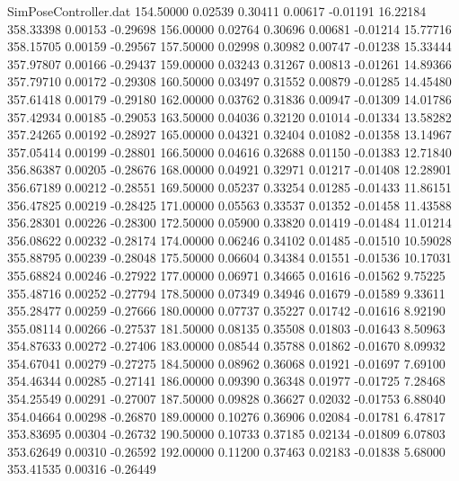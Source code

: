 \begin{filecontents}{SimPoseController.dat}
 154.50000    0.02539    0.30411     0.00617   -0.01191   16.22184  358.33398    0.00153   -0.29698
 156.00000    0.02764    0.30696     0.00681   -0.01214   15.77716  358.15705    0.00159   -0.29567
 157.50000    0.02998    0.30982     0.00747   -0.01238   15.33444  357.97807    0.00166   -0.29437
 159.00000    0.03243    0.31267     0.00813   -0.01261   14.89366  357.79710    0.00172   -0.29308
 160.50000    0.03497    0.31552     0.00879   -0.01285   14.45480  357.61418    0.00179   -0.29180
 162.00000    0.03762    0.31836     0.00947   -0.01309   14.01786  357.42934    0.00185   -0.29053
 163.50000    0.04036    0.32120     0.01014   -0.01334   13.58282  357.24265    0.00192   -0.28927
 165.00000    0.04321    0.32404     0.01082   -0.01358   13.14967  357.05414    0.00199   -0.28801
 166.50000    0.04616    0.32688     0.01150   -0.01383   12.71840  356.86387    0.00205   -0.28676
 168.00000    0.04921    0.32971     0.01217   -0.01408   12.28901  356.67189    0.00212   -0.28551
 169.50000    0.05237    0.33254     0.01285   -0.01433   11.86151  356.47825    0.00219   -0.28425
 171.00000    0.05563    0.33537     0.01352   -0.01458   11.43588  356.28301    0.00226   -0.28300
 172.50000    0.05900    0.33820     0.01419   -0.01484   11.01214  356.08622    0.00232   -0.28174
 174.00000    0.06246    0.34102     0.01485   -0.01510   10.59028  355.88795    0.00239   -0.28048
 175.50000    0.06604    0.34384     0.01551   -0.01536   10.17031  355.68824    0.00246   -0.27922
 177.00000    0.06971    0.34665     0.01616   -0.01562    9.75225  355.48716    0.00252   -0.27794
 178.50000    0.07349    0.34946     0.01679   -0.01589    9.33611  355.28477    0.00259   -0.27666
 180.00000    0.07737    0.35227     0.01742   -0.01616    8.92190  355.08114    0.00266   -0.27537
 181.50000    0.08135    0.35508     0.01803   -0.01643    8.50963  354.87633    0.00272   -0.27406
 183.00000    0.08544    0.35788     0.01862   -0.01670    8.09932  354.67041    0.00279   -0.27275
 184.50000    0.08962    0.36068     0.01921   -0.01697    7.69100  354.46344    0.00285   -0.27141
 186.00000    0.09390    0.36348     0.01977   -0.01725    7.28468  354.25549    0.00291   -0.27007
 187.50000    0.09828    0.36627     0.02032   -0.01753    6.88040  354.04664    0.00298   -0.26870
 189.00000    0.10276    0.36906     0.02084   -0.01781    6.47817  353.83695    0.00304   -0.26732
 190.50000    0.10733    0.37185     0.02134   -0.01809    6.07803  353.62649    0.00310   -0.26592
 192.00000    0.11200    0.37463     0.02183   -0.01838    5.68000  353.41535    0.00316   -0.26449

\end{filecontents}

